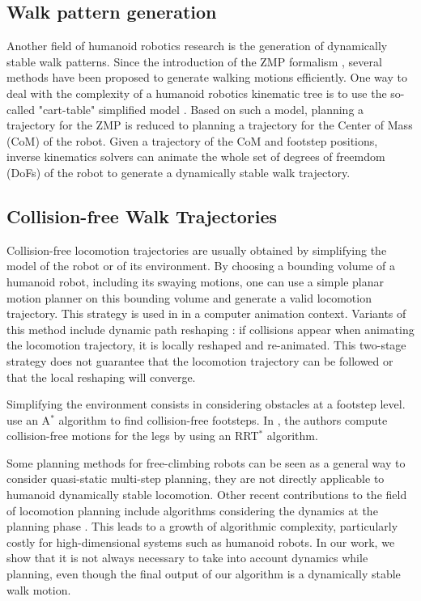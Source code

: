 \documentclass{article}
\begin{document}
\subsection{Walk pattern generation}

Another  field of  humanoid  robotics research  is  the generation  of
dynamically stable  walk patterns. Since  the introduction of  the ZMP
formalism  \cite{vukobratovic1969contribution},  several  methods  have  been  proposed  to
generate  walking  motions efficiently.   One  way  to  deal with  the
complexity  of a  humanoid  robotics  kinematic tree  is  to use  the
so-called "cart-table" simplified model \cite{kajita2003biped}. Based on such a
model,  planning a trajectory  for the  ZMP is  reduced to  planning a
trajectory  for  the Center  of  Mass (CoM)  of  the  robot.  Given  a
trajectory  of  the CoM  and  footstep  positions, inverse  kinematics
solvers can animate  the whole set of degrees of freemdom (DoFs) of the  
robot to generate a dynamically stable walk trajectory.

\subsection{Collision-free Walk Trajectories}

Collision-free  locomotion   trajectories  are  usually   obtained  by
simplifying the model of the  robot or of its environment. By choosing
a bounding volume of a  humanoid robot, including its swaying motions,
one can  use a simple  planar motion planner  on this bounding  volume and
generate  a valid  locomotion  trajectory. This  strategy  is used  in
\cite{pettre20032} in a computer animation context. Variants of this method
include  dynamic path reshaping  \cite{yoshida-humanoids05}: if  collisions appear
when animating  the locomotion  trajectory, it is  locally reshaped
and re-animated.  This two-stage  strategy does not guarantee that the
locomotion trajectory can be followed or that the local reshaping will
converge.

Simplifying  the environment  consists in  considering obstacles  at a
footstep   level.   \cite{chestnutt2005footstep,kuffner2005motion}
use   an  
A$^{*}$   algorithm  to   find
collision-free   footsteps.    In   \cite{perrinbiped},   the   authors   compute
collision-free motions  for the legs by using  an RRT$^{*}$ algorithm. 

Some planning methods for free-climbing robots \cite{bretl2006motion}
can be seen as a general way 
to consider quasi-static multi-step planning, they are not directly applicable to
humanoid dynamically stable locomotion.
Other recent contributions to the field of locomotion planning  include algorithms 
considering the dynamics at the planning phase \cite{shkolnik2011bounding}. This leads to 
a growth of algorithmic complexity, particularly costly for high-dimensional
systems such as humanoid robots. In our work, we show that it is not always
necessary to take into account dynamics while planning, even though the final
output of our algorithm is a dynamically stable walk motion.
\end{document}
